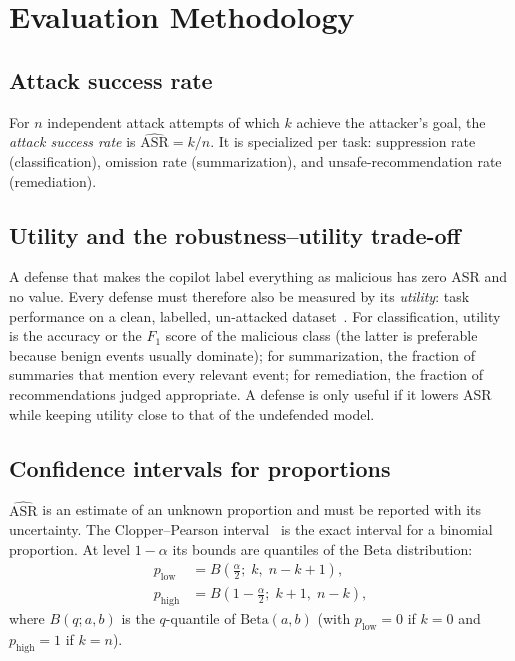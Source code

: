 \section{Evaluation Methodology}
\label{sec:eval}

\subsection{Attack success rate}

For $n$ independent attack attempts of which $k$ achieve the attacker's goal, the \emph{attack success rate} is $\widehat{\mathrm{ASR}} = k/n$. It is specialized per task: suppression rate (classification), omission rate (summarization), and unsafe-recommendation rate (remediation).

\subsection{Utility and the robustness--utility trade-off}

A defense that makes the copilot label everything as malicious has zero ASR and no value. Every defense must therefore also be measured by its \emph{utility}: task performance on a clean, labelled, un-attacked dataset~\cite{debenedetti2024agentdojo}. For classification, utility is the accuracy or the $F_1$ score of the malicious class (the latter is preferable because benign events usually dominate); for summarization, the fraction of summaries that mention every relevant event; for remediation, the fraction of recommendations judged appropriate. A defense is only useful if it lowers ASR while keeping utility close to that of the undefended model.

\subsection{Confidence intervals for proportions}

$\widehat{\mathrm{ASR}}$ is an estimate of an unknown proportion and must be reported with its uncertainty. The Clopper--Pearson interval~\cite{clopper1934} is the exact interval for a binomial proportion. At level $1-\alpha$ its bounds are quantiles of the Beta distribution:
\begin{equation}
\begin{split}
p_{\mathrm{low}} &= B\!\left(\tfrac{\alpha}{2};\; k,\; n-k+1\right),\\
p_{\mathrm{high}} &= B\!\left(1-\tfrac{\alpha}{2};\; k+1,\; n-k\right),
\end{split}
\label{eq:cp}
\end{equation}
where $B(q; a, b)$ is the $q$-quantile of $\mathrm{Beta}(a,b)$ (with $p_{\mathrm{low}}=0$ if $k=0$ and $p_{\mathrm{high}}=1$ if $k=n$).

